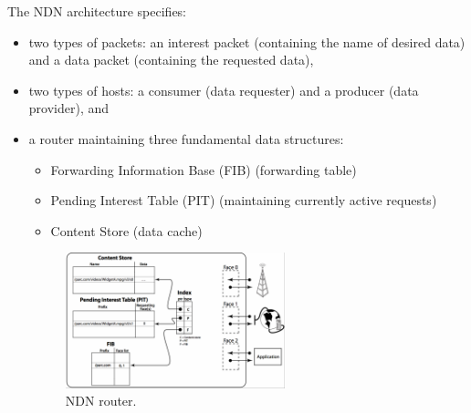                The NDN architecture specifies:
                    \begin{itemize}
                        \item two types of packets: an interest packet (containing the name of desired data) and a data packet (containing the requested data),
                        \item two types of hosts: a consumer (data requester) and a producer (data provider), and
                        \item a router maintaining three fundamental data structures:
                        \begin{itemize}
                            \item Forwarding Information Base (FIB) (forwarding table)
                            \item Pending Interest Table (PIT) (maintaining currently active requests)
                            \item Content Store (data cache)
                        \end{itemize}
                        \begin{figure}[H]
                            \begin{center}
                                \includegraphics[width=0.6\textwidth]{fig/archs_ndn-router.png}
                              \caption{NDN router.}
                              \label{fig:ndn-router}
                            \end{center}
                        \end{figure}

                    \end{itemize}

